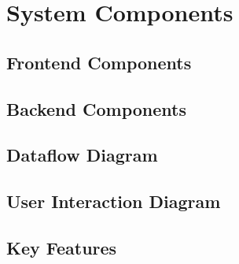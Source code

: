\section{System Components}
\subsection{Frontend Components}
\subsection{Backend Components}
\subsection{Dataflow Diagram}
\subsection{User Interaction Diagram}
\subsection{Key Features}


